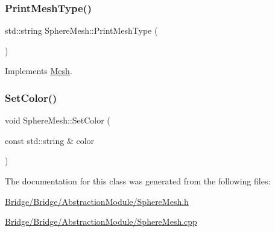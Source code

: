 \mbox{\label{class_sphere_mesh_ad40fa08f33e72acf0410c2ce6099ca4c}} 
\subsubsection{\texorpdfstring{PrintMeshType()}{PrintMeshType()}}
{\footnotesize\ttfamily std\+::string Sphere\+Mesh\+::\+Print\+Mesh\+Type (\begin{DoxyParamCaption}{ }\end{DoxyParamCaption})\hspace{0.3cm}{\ttfamily [virtual]}}



Implements \mbox{\hyperlink{class_mesh_a0d34fc4317a5e3bc2437b610141b9109}{Mesh}}.

\mbox{\label{class_sphere_mesh_a8e9e0a923060501e12f278508ac96f13}} 
\subsubsection{\texorpdfstring{SetColor()}{SetColor()}}
{\footnotesize\ttfamily void Sphere\+Mesh\+::\+Set\+Color (\begin{DoxyParamCaption}\item[{const std\+::string \&}]{color }\end{DoxyParamCaption})}



The documentation for this class was generated from the following files\+:\begin{DoxyCompactItemize}
\item 
\mbox{\hyperlink{_bridge_2_bridge_2_abstraction_module_2_sphere_mesh_8h}{Bridge/\+Bridge/\+Abstraction\+Module/\+Sphere\+Mesh.\+h}}\item 
\mbox{\hyperlink{_bridge_2_bridge_2_abstraction_module_2_sphere_mesh_8cpp}{Bridge/\+Bridge/\+Abstraction\+Module/\+Sphere\+Mesh.\+cpp}}\end{DoxyCompactItemize}
